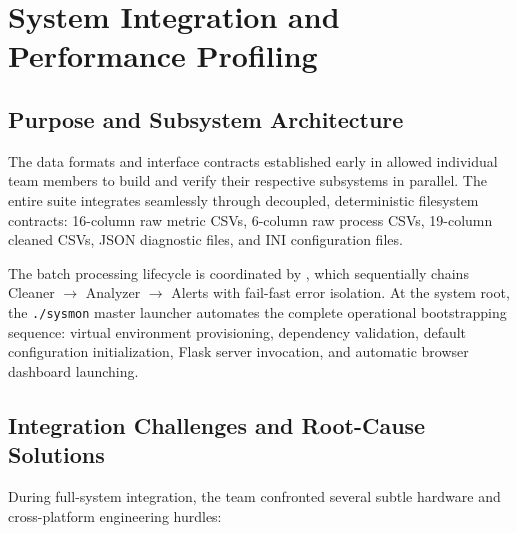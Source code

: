 \section{System Integration and Performance Profiling}
\label{sec:integration_profiling}

\subsection{Purpose and Subsystem Architecture}
The data formats and interface contracts established early in  allowed individual team members to build and verify their respective subsystems in parallel. The entire suite integrates seamlessly through decoupled, deterministic filesystem contracts: 16-column raw metric CSVs, 6-column raw process CSVs, 19-column cleaned CSVs, JSON diagnostic files, and INI configuration files. 

The batch processing lifecycle is coordinated by , which sequentially chains Cleaner $\to$ Analyzer $\to$ Alerts with fail-fast error isolation. At the system root, the \texttt{./sysmon} master launcher automates the complete operational bootstrapping sequence: virtual environment provisioning, dependency validation, default configuration initialization, Flask server invocation, and automatic browser dashboard launching.

\subsection{Integration Challenges and Root-Cause Solutions}
During full-system integration, the team confronted several subtle hardware and cross-platform engineering hurdles:

